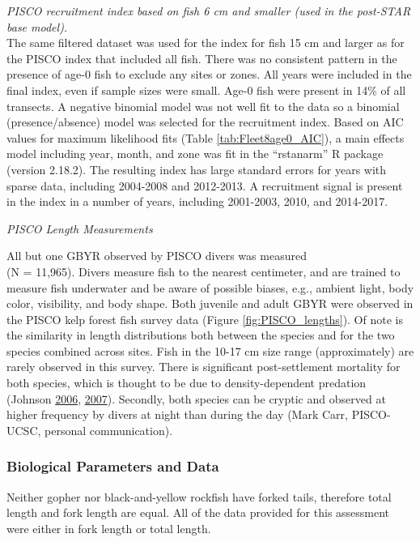 \documentclass[12pt,]{article}
\begin{document}
\emph{PISCO recruitment index based on fish 6 cm and smaller (used in
the post-STAR base model).}\\
The same filtered dataset was used for the index for fish 15 cm and
larger as for the PISCO index that included all fish. There was no
consistent pattern in the presence of age-0 fish to exclude any sites or
zones. All years were included in the final index, even if sample sizes
were small. Age-0 fish were present in 14\% of all transects. A negative
binomial model was not well fit to the data so a binomial
(presence/absence) model was selected for the recruitment index. Based
on AIC values for maximum likelihood fits (Table
\ref{tab:Fleet8age0_AIC}), a main effects model including year, month,
and zone was fit in the ``rstanarm'' R package (version 2.18.2). The
resulting index has large standard errors for years with sparse data,
including 2004-2008 and 2012-2013. A recruitment signal is present in
the index in a number of years, including 2001-2003, 2010, and
2014-2017.

\emph{PISCO Length Measurements}

All but one GBYR observed by PISCO divers was measured\\
(N = 11,965). Divers measure fish to the nearest centimeter, and are
trained to measure fish underwater and be aware of possible biases,
e.g., ambient light, body color, visibility, and body shape. Both
juvenile and adult GBYR were observed in the PISCO kelp forest fish
survey data (Figure \ref{fig:PISCO_lengths}). Of note is the similarity
in length distributions both between the species and for the two species
combined across sites. Fish in the 10-17 cm size range (approximately)
are rarely observed in this survey. There is significant post-settlement
mortality for both species, which is thought to be due to
density-dependent predation (Johnson
\protect\hyperlink{ref-Johnson2006}{2006},
\protect\hyperlink{ref-Johnson2007}{2007}). Secondly, both species can
be cryptic and observed at higher frequency by divers at night than
during the day (Mark Carr, PISCO-UCSC, personal communication).

\subsubsection{Biological Parameters and
Data}\label{biological-parameters-and-data}

Neither gopher nor black-and-yellow rockfish have forked tails,
therefore total length and fork length are equal. All of the data
provided for this assessment were either in fork length or total length.
\end{document}

